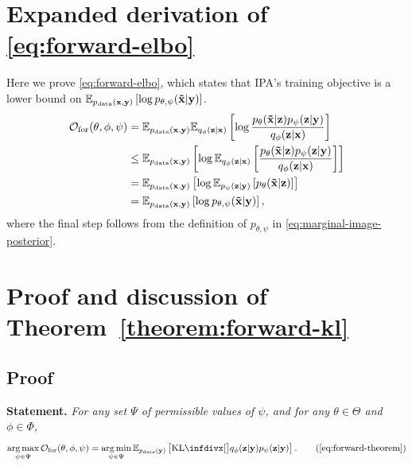 \section{Expanded derivation of \cref{eq:forward-elbo}} \label{supp:cigcvae-forward-elbo-bound-deriv}
Here we prove \cref{eq:forward-elbo}, which states that IPA's training
objective is a lower bound on $\mathbb{E}_{p_{\rm{data}} ({\mathbf{x}}, {\mathbf{y}})} \left[ \log
  p_{\theta,\psi}(\mathbf{\tilde{x}}{}|{\mathbf{y}}) \right]$.
\begin{align}
  \mathcal{O}_\mathrm{for}(\theta, \phi, \psi ) &= \mathbb{E}_{p_{\rm{data}} ({\mathbf{x}}, {\mathbf{y}})} \mathbb{E}_{q_\phi({\mathbf{z}}|{\mathbf{x}})} \left[ \log \frac{p_\theta(\mathbf{\tilde{x}}{}|{\mathbf{z}})p_\psi({\mathbf{z}}|{\mathbf{y}})}{q_\phi({\mathbf{z}}|{\mathbf{x}})} \right] \\
                                                   &\leq \mathbb{E}_{p_{\rm{data}} ({\mathbf{x}}, {\mathbf{y}})} \left[ \log \mathbb{E}_{q_\phi({\mathbf{z}}|{\mathbf{x}})} \left[ \frac{p_\theta(\mathbf{\tilde{x}}{}|{\mathbf{z}})p_\psi({\mathbf{z}}|{\mathbf{y}})}{q_\phi({\mathbf{z}}|{\mathbf{x}})} \right]  \right] \\
                                                   &= \mathbb{E}_{p_{\rm{data}} ({\mathbf{x}}, {\mathbf{y}})} \left[ \log \mathbb{E}_{p_\psi({\mathbf{z}}|{\mathbf{y}})} \left[ p_\theta(\mathbf{\tilde{x}}{}|{\mathbf{z}}) \right]  \right] \\
                                                   &= \mathbb{E}_{p_{\rm{data}} ({\mathbf{x}}, {\mathbf{y}})} \left[ \log p_{\theta,\psi}(\mathbf{\tilde{x}}{}|{\mathbf{y}}) \right],
\end{align}
where the final step follows from the definition of $p_{\theta,\psi}$ in
\cref{eq:marginal-image-posterior}.


\section{Proof and discussion of Theorem~\ref{theorem:forward-kl}} \label{proof:forward-kl}
\subsection{Proof}
\textbf{Statement.}
\textit{
  For any set $\Psi$ of
  permissible values of $\psi $, and for any $\theta\in\Theta$ and
  $\phi\in\Phi$,
  \begin{equation}
    \argmax_{\psi  \in \Psi} \mathcal{O}_\mathrm{for}(\theta, \phi, \psi ) = \argmin_{\psi  \in \Psi} \EX_{\pdata (\rvy)} \left[ \kl[\big]{ q_\phi(\rvz|\rvy) }{ p_\psi(\rvz|\rvy) } \right]. \tag{\ref{eq:forward-theorem}}
  \end{equation}
}

